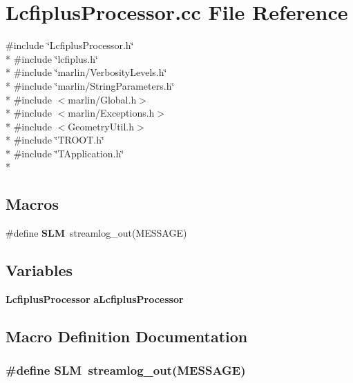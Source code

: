\section{Lcfiplus\-Processor.\-cc File Reference}
\label{LcfiplusProcessor_8cc}
{\ttfamily \#include \char`\"{}Lcfiplus\-Processor.\-h\char`\"{}}\\*
{\ttfamily \#include \char`\"{}lcfiplus.\-h\char`\"{}}\\*
{\ttfamily \#include \char`\"{}marlin/\-Verbosity\-Levels.\-h\char`\"{}}\\*
{\ttfamily \#include \char`\"{}marlin/\-String\-Parameters.\-h\char`\"{}}\\*
{\ttfamily \#include $<$marlin/\-Global.\-h$>$}\\*
{\ttfamily \#include $<$marlin/\-Exceptions.\-h$>$}\\*
{\ttfamily \#include $<$Geometry\-Util.\-h$>$}\\*
{\ttfamily \#include \char`\"{}T\-R\-O\-O\-T.\-h\char`\"{}}\\*
{\ttfamily \#include \char`\"{}T\-Application.\-h\char`\"{}}\\*
\subsection*{Macros}
\begin{DoxyCompactItemize}
\item 
\#define {\bf S\-L\-M}~streamlog\-\_\-out(M\-E\-S\-S\-A\-G\-E)
\end{DoxyCompactItemize}
\subsection*{Variables}
\begin{DoxyCompactItemize}
\item 
{\bf Lcfiplus\-Processor} {\bf a\-Lcfiplus\-Processor}
\end{DoxyCompactItemize}


\subsection{Macro Definition Documentation}
\subsubsection[{S\-L\-M}]{\setlength{\rightskip}{0pt plus 5cm}\#define S\-L\-M~streamlog\-\_\-out(M\-E\-S\-S\-A\-G\-E)}\label{LcfiplusProcessor_8cc_a4167df92ac1eb2e31f1600361c7fe0c4}


